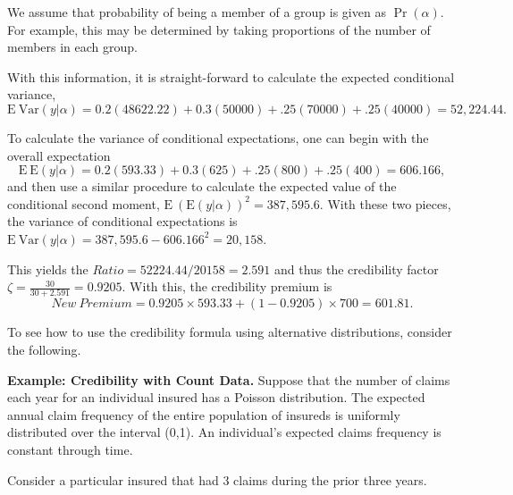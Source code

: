 We assume that probability of being a member of a group is given as
$\Pr(\alpha)$. For example, this may be determined by taking
proportions of the number of members in each group.

With this information, it is straight-forward to calculate the
expected conditional variance,
\begin{equation*}
\mathrm{E~}\mathrm{Var}(y | \alpha) = 0.2(48622.22) + 0.3(50000) +
.25(70000) + .25(40000) = 52,224.44 .
\end{equation*}

To calculate the variance of conditional expectations, one can begin
with the overall expectation
\begin{equation*}
\mathrm{E~}\mathrm{E}(y | \alpha) = 0.2(593.33) + 0.3(625) +
.25(800) + .25(400) = 606.166,
\end{equation*}
and then use a similar procedure to calculate the expected value of
the conditional second moment, $\mathrm{E~}(\mathrm{E}(y |
\alpha))^2 = 387,595.6$. With these two pieces, the variance of
conditional expectations is $\mathrm{E~}\mathrm{Var}(y | \alpha) =
387,595.6- 606.166^2 = 20,158.$

This yields the $Ratio=52224.44/20158 = 2.591$ and thus the
credibility factor $\zeta  = \frac{30}{30+2.591} = 0.9205$. With
this, the credibility premium is
\begin{equation*}
New~Premium =  0.9205 \times 593.33 + (1 - 0.9205)  \times 700 =
601.81.
\end{equation*}

\linejed

\bigskip

To see how to use the credibility formula using alternative
distributions, consider the following.

\bigskip

\linejed

\textbf{Example: Credibility with Count Data.} Suppose that the
number of claims each year for an individual insured has a Poisson
distribution. The expected annual claim frequency of the entire
population of insureds is uniformly distributed over the interval
(0,1). An individual's expected claims frequency is constant through
time.

Consider a particular insured that had 3 claims during the prior
three years.

